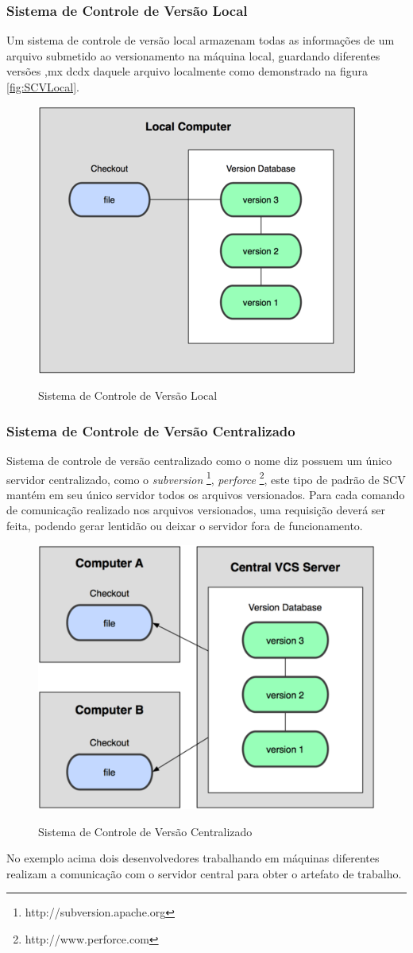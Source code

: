 \subsubsection{Sistema de Controle de Versão Local}
Um sistema de controle de versão local	armazenam todas as informações de um arquivo submetido ao versionamento na máquina local, guardando diferentes versões    ,mx dcdx daquele arquivo localmente como demonstrado na figura \autoref{fig:SCVLocal}.
\begin{figure}[tbh]
\centering
\caption[Sistema de Controle de Versão Local]{Sistema de Controle de Versão Local}
\includegraphics[width=0.5\linewidth]{./images/scvlocal}
\label{fig:SCVLocal}
\end{figure}
\subsubsection{Sistema de Controle de Versão Centralizado} Sistema de controle de versão centralizado como o nome diz possuem um único servidor centralizado, como o \textit{subversion} \footnote{http://subversion.apache.org}, \textit{perforce} \footnote{http://www.perforce.com}, este tipo de padrão de SCV mantém em seu único servidor todos os arquivos versionados. Para cada comando de comunicação realizado nos arquivos versionados, uma requisição deverá ser feita, podendo gerar lentidão ou deixar o servidor fora de funcionamento.
\begin{figure}[tbh]
\centering
\caption[Sistema de Controle de Versão Centralizado]{Sistema de Controle de Versão Centralizado}
\includegraphics[width=0.5\linewidth]{./images/scvcentral}
\label{fig:SCVCentral}
\end{figure}
No exemplo acima dois desenvolvedores trabalhando em máquinas diferentes realizam a comunicação com o servidor central para obter o artefato de trabalho.	
